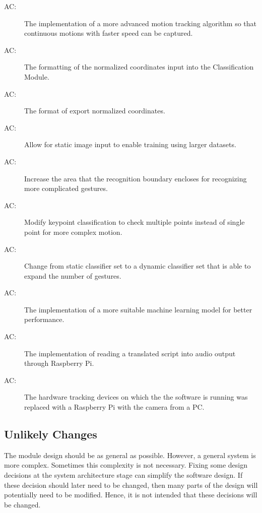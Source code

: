 \documentclass[12pt, titlepage]{article}
\newcounter{acnum}
\newcommand{\actheacnum}{AC\theacnum}
\begin{document}
\begin{description}
\item[ \actheacnum \label{acMotionT}:] The implementation of a more advanced motion tracking algorithm so that continuous motions with faster speed can be captured.
\item[ \actheacnum \label{acCoordN}:] The formatting of the normalized coordinates input into the Classification Module.
\item[ \actheacnum \label{acCoordE}:] The format of export normalized coordinates.
\item[ \actheacnum \label{acVideoC}:] Allow for static image input to enable training using larger datasets.
\item[ \actheacnum \label{acVideoA}:] Increase the area that the recognition boundary encloses for recognizing more complicated gestures.
\item[ \actheacnum \label{acKeyPointC}:] Modify keypoint classification to check multiple points instead of single point for more complex motion.
\item[ \actheacnum \label{acML}:] Change from static classifier set to a dynamic classifier set that is able to expand the number of gestures.
\item[ \actheacnum \label{acTraining}:] The implementation of a more suitable machine learning model for better performance.
\item[ \actheacnum \label{acTextToSpeech}:] The implementation of reading a translated script into audio output through Raspberry Pi.
\item[ \actheacnum \label{acHardware}:] The hardware tracking devices on which the the software is running was replaced with a Raspberry Pi with the camera from a PC.



\end{description}

\subsection{Unlikely Changes} \label{SecUchange}

The module design should be as general as possible. However, a general system is
more complex. Sometimes this complexity is not necessary. Fixing some design
decisions at the system architecture stage can simplify the software design. If
these decision should later need to be changed, then many parts of the design
will potentially need to be modified. Hence, it is not intended that these
decisions will be changed.
\end{document}
